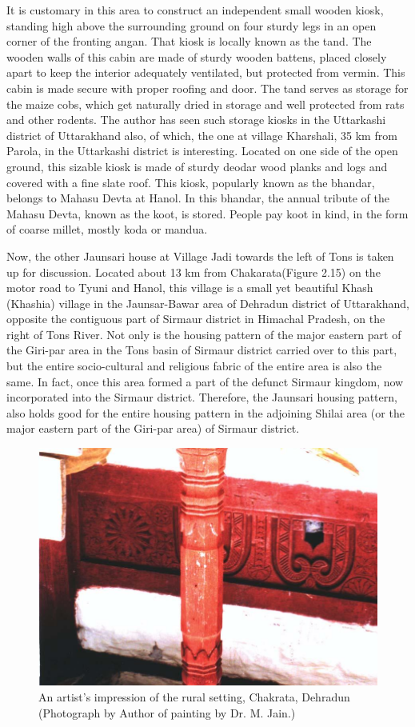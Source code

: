 It is customary in this area to construct an independent small wooden kiosk, standing high above the surrounding ground on four sturdy legs in an open corner of the fronting angan. That kiosk is locally known as the tand. The wooden walls of this cabin are made of sturdy wooden battens, placed closely apart to keep the interior adequately ventilated, but protected from vermin. This cabin is made secure with proper roofing and door. The tand serves as storage for the maize cobs, which get naturally dried in storage and well protected from rats and other rodents. The author has seen such storage kiosks in the Uttarkashi district of Uttarakhand also, of which, the one at village Kharshali, 35 km from Parola, in the Uttarkashi district is interesting. Located on one side of the open ground, this sizable kiosk is made of sturdy deodar wood planks and logs and covered with a fine slate roof. This kiosk, popularly known as the bhandar, belongs to Mahasu Devta at Hanol. In this bhandar, the annual tribute of the Mahasu Devta, known as the koot, is stored. People pay koot in kind, in the form of coarse millet, mostly koda or mandua.

Now, the other Jaunsari house at Village Jadi towards the left of Tons is taken up for discussion. Located about 13 km from Chakarata\break (Figure 2.15) on the motor road to Tyuni and Hanol, this village is a small yet beautiful Khash (Khashia) village in the Jaunsar-Bawar area of Dehradun district of Uttarakhand, opposite the contiguous part of Sirmaur district in Himachal Pradesh, on the right of Tons River. Not only is the housing pattern of the major eastern part of the Giri-par area in the Tons basin of Sirmaur district carried over to this part, but the entire socio-cultural and religious fabric of the entire area is also the same. In fact, once this area formed a part of the defunct Sirmaur kingdom, now incorporated into the Sirmaur district. Therefore, the Jaunsari housing pattern, also holds good for the entire housing pattern in the adjoining Shilai area (or the major eastern part of the Giri-par area) of Sirmaur district.

\begin{figure}[!htbp]
\includegraphics[scale=.28]{images/chap02-15.jpg}
\caption{An artist’s impression of the rural setting, Chakrata, Dehradun (Photograph by Author of painting by Dr. M. Jain.)}\label{chap02-fig15}
\end{figure}

